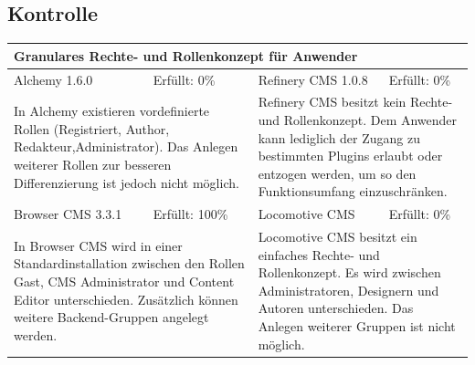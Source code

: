\subsection{Kontrolle}
\begin{tabular}[!ht]{|l|l|l|l|}
\hline
\multicolumn{4}{|p{15cm}|}{\textbf{Granulares Rechte- und Rollenkonzept für Anwender}} \\
\hline
  Alchemy 1.6.0 & \cellcolor{red}Erfüllt: 0\% & Refinery CMS 1.0.8 & \cellcolor{red}Erfüllt: 0\% \\
  \hline
  \multicolumn{2}{|p{7.5cm}|}{In Alchemy existieren vordefinierte Rollen (Registriert, Author, Redakteur,Administrator). Das Anlegen weiterer Rollen zur besseren Differenzierung ist jedoch nicht möglich.}
   & \multicolumn{2}{p{7.5cm}|}{Refinery CMS besitzt kein Rechte- und Rollenkonzept. Dem Anwender kann lediglich der Zugang zu bestimmten Plugins erlaubt oder entzogen werden, um so den Funktionsumfang einzuschränken.} \\
  \hline
  Browser CMS 3.3.1 & \cellcolor{green}Erfüllt: 100\% & Locomotive CMS & \cellcolor{red}Erfüllt: 0\% \\
  \hline
  \multicolumn{2}{|p{7.5cm}|}{In Browser CMS wird in einer Standardinstallation zwischen den Rollen Gast, CMS Administrator und Content Editor unterschieden. Zusätzlich können weitere Backend-Gruppen angelegt werden.} & \multicolumn{2}{p{7.5cm}|}{Locomotive CMS besitzt ein einfaches Rechte- und Rollenkonzept. Es wird zwischen Administratoren, Designern und Autoren unterschieden. Das Anlegen weiterer Gruppen ist nicht möglich.} \\
\hline
\end{tabular}
\newline
\newline
\newline
